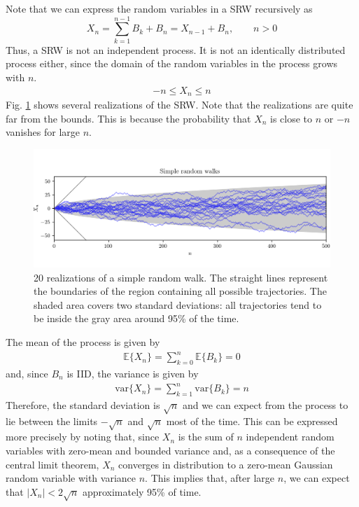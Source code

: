 Note that we can express the random variables in a SRW recursively as
 \begin{equation}
X_n = \sum_{k=1}^{n-1} B_k + B_n = X_{n-1} + B_n,    \qquad  n>0
\label{sp:srw_rec}
\end{equation}
Thus, a SRW is not an independent process. It is not an identically distributed process either, since the domain of the random variables in the process grows with $n$. 
\begin{align}
-n \le X_n \le n
\end{align}
Fig. \ref{fig:sp_srw} shows several realizations of the SRW. Note that the realizations are quite far from the bounds. This is because the probability that $X_n$ is close to $n$ or $-n$ vanishes for large $n$.
\begin{figure}[htb]
  \begin{center}
    \includegraphics[width=14cm]{Figures//sp_random_walk_1d.png} 
    \caption{20 realizations of a simple random walk. The straight lines represent the boundaries of the region containing all possible trajectories. The shaded area covers two standard deviations: all trajectories tend to be inside the gray area around 95\% of the time.}
    \label{fig:sp_srw}
  \end{center}
\end{figure}

The mean of the process is given by
\begin{align}
\mathbb{E}\{X_n\} = \sum_{k=0}^n \mathbb{E}\{B_k\} = 0
\end{align}
and, since $B_n$ is IID, the variance is given by
\begin{align}
\text{var}\{X_n\} = \sum_{k=1}^n \text{var}\{B_k\} = n
\end{align}
Therefore, the standard deviation is $\sqrt{n}$ and we can expect from the process to lie between the limits $-\sqrt{n}$ and $\sqrt{n}$ most of the time. This can be expressed more precisely by noting that, since $X_n$ is the sum of $n$ independent random variables with zero-mean and bounded variance and, as a consequence of the central limit theorem, $X_n$ converges in distribution to a zero-mean Gaussian random variable with variance $n$. This implies that, after large $n$, we can expect that $|X_n| < 2\sqrt{n}$ approximately 95\% of time.

